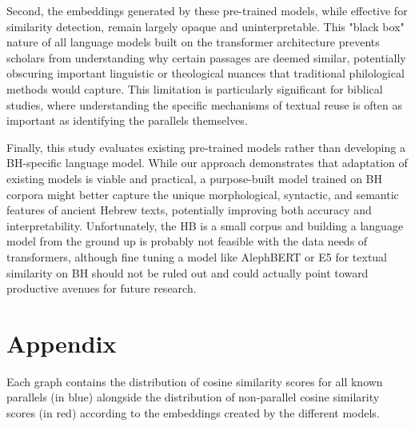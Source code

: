 \documentclass[12pt]{article}
\begin{document}
Second, the embeddings generated by these pre-trained models, while effective for similarity detection, remain largely opaque and uninterpretable. This "black box" nature of all language models built on the transformer architecture prevents scholars from understanding why certain passages are deemed similar, potentially obscuring important linguistic or theological nuances that traditional philological methods would capture. This limitation is particularly significant for biblical studies, where understanding the specific mechanisms of textual reuse is often as important as identifying the parallels themselves.

Finally, this study evaluates existing pre-trained models rather than developing a BH-specific language model. While our approach demonstrates that adaptation of existing models is viable and practical, a purpose-built model trained on BH corpora might better capture the unique morphological, syntactic, and semantic features of ancient Hebrew texts, potentially improving both accuracy and interpretability. Unfortunately, the HB is a small corpus and building a language model from the ground up is probably not feasible with the data needs of transformers, although fine tuning a model like AlephBERT or E5 for textual similarity on BH should not be ruled out and could actually point toward productive avenues for future research.


\clearpage
\appendix
\section*{Appendix}

Each graph contains the distribution of cosine similarity scores for all known parallels (in blue) alongside the distribution of non-parallel cosine similarity scores (in red) according to the embeddings created by the different models.
\end{document}
